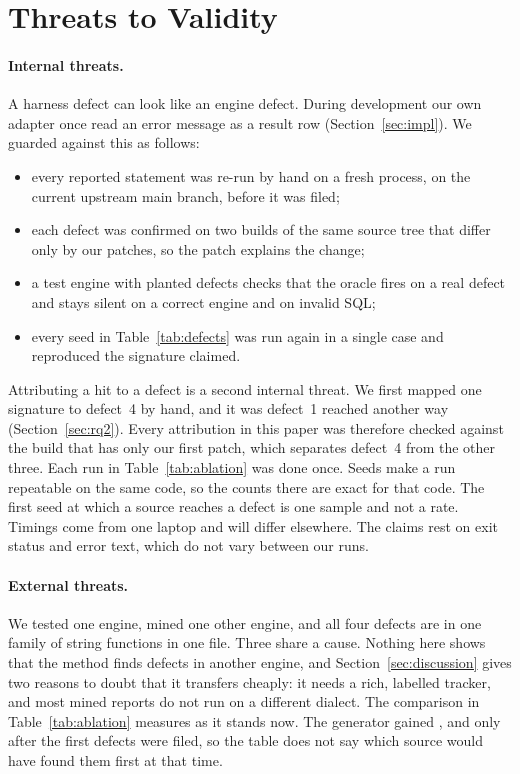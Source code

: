 \section{Threats to Validity}
\label{sec:threats}

\paragraph{Internal threats.} A harness defect can look like an engine defect.
During development our own adapter once read an error message as a result row
(Section~\ref{sec:impl}). We guarded against this as follows:
\begin{itemize}
  \item every reported statement was re-run by hand on a fresh process, on the
        current upstream main branch, before it was filed;
  \item each defect was confirmed on two builds of the same source tree that
        differ only by our patches, so the patch explains the change;
  \item a test engine with planted defects checks that the oracle fires on a real
        defect and stays silent on a correct engine and on invalid SQL;
  \item every seed in Table~\ref{tab:defects} was run again in a single case and
        reproduced the signature claimed.
\end{itemize}
Attributing a hit to a defect is a second internal threat. We first mapped one
signature to defect~4 by hand, and it was defect~1 reached another way
(Section~\ref{sec:rq2}). Every attribution in this paper was therefore checked
against the build that has only our first patch, which separates defect~4 from
the other three. Each run in Table~\ref{tab:ablation} was done once. Seeds make
a run repeatable on the same code, so the counts there are exact for that code.
The first seed at which a source reaches a defect is one sample and not a rate.
Timings come from one laptop and will differ elsewhere. The claims rest on exit
status and error text, which do not vary between our runs.

\paragraph{External threats.} We tested one engine, mined one other engine, and
all four defects are in one family of string functions in one file. Three share a
cause. Nothing here shows that the method finds defects in another engine, and
Section~\ref{sec:discussion} gives two reasons to doubt that it transfers cheaply:
it needs a rich, labelled tracker, and most mined reports do not run on a
different dialect. The comparison in Table~\ref{tab:ablation} measures \tool as
it stands now. The generator gained ,  and  only
after the first defects were filed, so the table does not say which source would
have found them first at that time.

